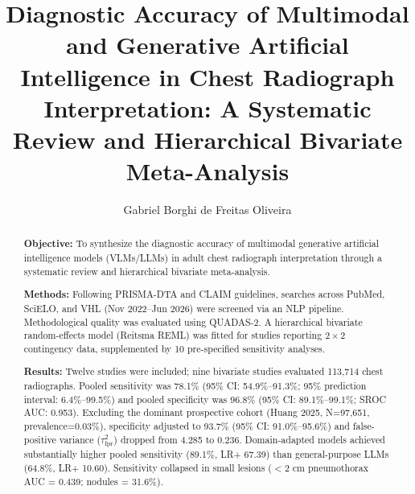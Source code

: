 \documentclass[preprint,11pt]{elsarticle}
\begin{document}
\begin{frontmatter}

\title{Diagnostic Accuracy of Multimodal and Generative Artificial Intelligence in Chest Radiograph Interpretation: A Systematic Review and Hierarchical Bivariate Meta-Analysis}

\author[aff1]{Gabriel Borghi de Freitas Oliveira}


\begin{abstract}
\noindent \textbf{Objective:} To synthesize the diagnostic accuracy of multimodal generative artificial intelligence models (VLMs/LLMs) in adult chest radiograph interpretation through a systematic review and hierarchical bivariate meta-analysis.

\noindent \textbf{Methods:} Following PRISMA-DTA and CLAIM guidelines, searches across PubMed, SciELO, and VHL (Nov 2022--Jun 2026) were screened via an NLP pipeline. Methodological quality was evaluated using QUADAS-2. A hierarchical bivariate random-effects model (Reitsma REML) was fitted for studies reporting $2\times 2$ contingency data, supplemented by 10 pre-specified sensitivity analyses.

\noindent \textbf{Results:} Twelve studies were included; nine bivariate studies evaluated 113,714 chest radiographs. Pooled sensitivity was 78.1\% (95\% CI: 54.9\%--91.3\%; 95\% prediction interval: 6.4\%--99.5\%) and pooled specificity was 96.8\% (95\% CI: 89.1\%--99.1\%; SROC AUC: 0.953). Excluding the dominant prospective cohort (Huang 2025, N=97,651, prevalence=0.03\%), specificity adjusted to 93.7\% (95\% CI: 91.0\%--95.6\%) and false-positive variance ($\tau^2_{\text{fpr}}$) dropped from 4.285 to 0.236. Domain-adapted models achieved substantially higher pooled sensitivity (89.1\%, LR+ 67.39) than general-purpose LLMs (64.8\%, LR+ 10.60). Sensitivity collapsed in small lesions ($<2$ cm pneumothorax AUC = 0.439; nodules = 31.6\%).


\end{abstract}
\end{frontmatter}
\end{document}
